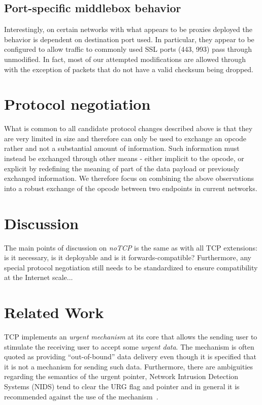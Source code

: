 \documentclass{sig-alternate-10pt}
\begin{document}
\subsection{Port-specific middlebox behavior}

Interestingly, on certain networks with what appears to be proxies deployed the behavior is dependent on destination port used. In particular, they appear to be configured to allow traffic to commonly used SSL ports (443, 993) pass through unmodified. In fact, most of our attempted modifications are allowed through with the exception of packets that do not have a valid checksum being dropped.

\section{Protocol negotiation}

What is common to all candidate protocol changes described above is that they are very limited in size and therefore can only be used to exchange an opcode rather and not a substantial amount of information. Such information must instead be exchanged through other means - either implicit to the opcode, or explicit by redefining the meaning of part of the data payload or previously exchanged information. We therefore focus on combining the above observations into a robust exchange of the opcode between two endpoints in current networks.

\section{Discussion}

The main points of discussion on \emph{noTCP} is the same as with all TCP extensions: is it necessary, is it deployable and is it forwards-compatible? Furthermore, any special protocol negotiation still needs to be standardized to ensure compatibility at the Internet scale...



\section{Related Work}
\label{sec:related}

TCP implements an \emph{urgent mechanism} at its core that allows the sending user to stimulate the receiving user to accept some \emph{urgent data}. The mechanism is often quoted as providing ``out-of-bound'' data delivery even though it is specified that it is not a mechanism for sending such data. Furthermore, there are ambiguities regarding the semantics of the urgent pointer, Network Intrusion Detection Systems (NIDS) tend to clear the URG flag and pointer and in general it is recommended against the use of the mechanism~\cite{Gont:2011vi}.
\end{document}
